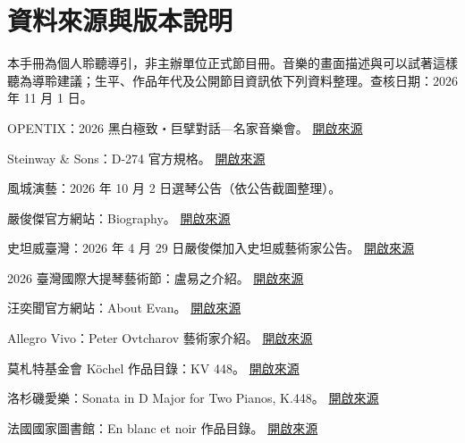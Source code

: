 \documentclass[UTF8,12pt,a4paper,fontset=none]{ctexart}
\begin{document}
\section{資料來源與版本說明}
{\small 本手冊為個人聆聽導引，非主辦單位正式節目冊。音樂的畫面描述與可以試著這樣聽為導聆建議；生平、作品年代及公開節目資訊依下列資料整理。查核日期：2026 年 11 月 1 日。}
\begin{enumerate}[label={[\arabic*]},leftmargin=*,itemsep=6pt,font=\small]

\item OPENTIX：2026 黑白極致・巨擘對話—名家音樂會。 \href{https://www.opentix.life/event/2089958531710963713}{開啟來源}

\item Steinway \& Sons：D-274 官方規格。 \href{https://eu.steinway.com/en/pianos/grand-pianos/d-274}{開啟來源}

\item 風城演藝：2026 年 10 月 2 日選琴公告（依公告截圖整理）。

\item 嚴俊傑官方網站：Biography。 \href{https://www.chunchiehyen.com/biography}{開啟來源}

\item 史坦威臺灣：2026 年 4 月 29 日嚴俊傑加入史坦威藝術家公告。 \href{https://www.steinway.com.tw/news/steinway-news/20260429-Steinway-Artist-Prof.-Yen-Chun-Chieh.}{開啟來源}

\item 2026 臺灣國際大提琴藝術節：盧易之介紹。 \href{https://www.twicf.org/artist/\%E7\%9B\%A7\%E6\%98\%93\%E4\%B9\%8B-yi-chih-lu}{開啟來源}

\item 汪奕聞官方網站：About Evan。 \href{https://www.evanwongpiano.com/bio?lang=zh}{開啟來源}

\item Allegro Vivo：Peter Ovtcharov 藝術家介紹。 \href{https://www.allegro-vivo.at/en/artist/peter-ovtcharov/}{開啟來源}

\item 莫札特基金會 Köchel 作品目錄：KV 448。 \href{https://kv.mozarteum.at/en/work/sonata-in-d-for-2-keyboard-instruments-4748}{開啟來源}

\item 洛杉磯愛樂：Sonata in D Major for Two Pianos, K.448。 \href{https://www.laphil.com/works/sonata-in-d-major-for-two-pianos-k-448}{開啟來源}

\item 法國國家圖書館：En blanc et noir 作品目錄。 \href{https://catalogue.bnf.fr/ark:/12148/cb13911379p}{開啟來源}


\end{enumerate}
\end{document}
